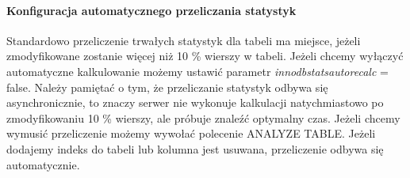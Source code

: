 \paragraph{Konfiguracja automatycznego przeliczania statystyk}
Standardowo przeliczenie trwałych statystyk dla tabeli ma miejsce, jeżeli zmodyfikowane zostanie więcej niż 10 \% wierszy w tabeli. Jeżeli chcemy wyłączyć automatyczne kalkulowanie możemy ustawić parametr \textit{innodb\textunderscore stats\textunderscore auto\textunderscore recalc} = false. Należy pamiętać o tym, że przeliczanie statystyk odbywa się asynchronicznie, to znaczy serwer nie wykonuje kalkulacji natychmiastowo po zmodyfikowaniu 10 \% wierszy, ale próbuje znaleźć optymalny czas. Jeżeli chcemy wymusić przeliczenie możemy wywołać polecenie ANALYZE TABLE. Jeżeli dodajemy indeks do tabeli lub kolumna jest usuwana, przeliczenie odbywa się automatycznie.

